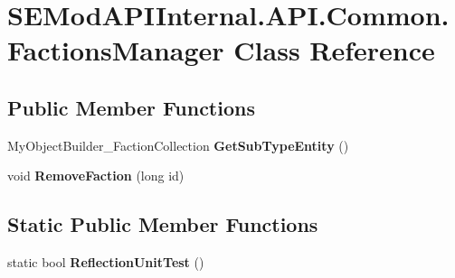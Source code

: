 \hypertarget{class_s_e_mod_a_p_i_internal_1_1_a_p_i_1_1_common_1_1_factions_manager}{}\section{S\+E\+Mod\+A\+P\+I\+Internal.\+A\+P\+I.\+Common.\+Factions\+Manager Class Reference}
\label{class_s_e_mod_a_p_i_internal_1_1_a_p_i_1_1_common_1_1_factions_manager}
\subsection*{Public Member Functions}
\begin{DoxyCompactItemize}
\item 
\hypertarget{class_s_e_mod_a_p_i_internal_1_1_a_p_i_1_1_common_1_1_factions_manager_afd75e20fc4dd95ad9eb1a093d321c331}{}My\+Object\+Builder\+\_\+\+Faction\+Collection {\bfseries Get\+Sub\+Type\+Entity} ()\label{class_s_e_mod_a_p_i_internal_1_1_a_p_i_1_1_common_1_1_factions_manager_afd75e20fc4dd95ad9eb1a093d321c331}

\item 
\hypertarget{class_s_e_mod_a_p_i_internal_1_1_a_p_i_1_1_common_1_1_factions_manager_abf36b5fd85125b10279d78ff9b537484}{}void {\bfseries Remove\+Faction} (long id)\label{class_s_e_mod_a_p_i_internal_1_1_a_p_i_1_1_common_1_1_factions_manager_abf36b5fd85125b10279d78ff9b537484}

\end{DoxyCompactItemize}
\subsection*{Static Public Member Functions}
\begin{DoxyCompactItemize}
\item 
\hypertarget{class_s_e_mod_a_p_i_internal_1_1_a_p_i_1_1_common_1_1_factions_manager_a12c2169c9e49bfef7df14c1f9561e66e}{}static bool {\bfseries Reflection\+Unit\+Test} ()\label{class_s_e_mod_a_p_i_internal_1_1_a_p_i_1_1_common_1_1_factions_manager_a12c2169c9e49bfef7df14c1f9561e66e}

\end{DoxyCompactItemize}
